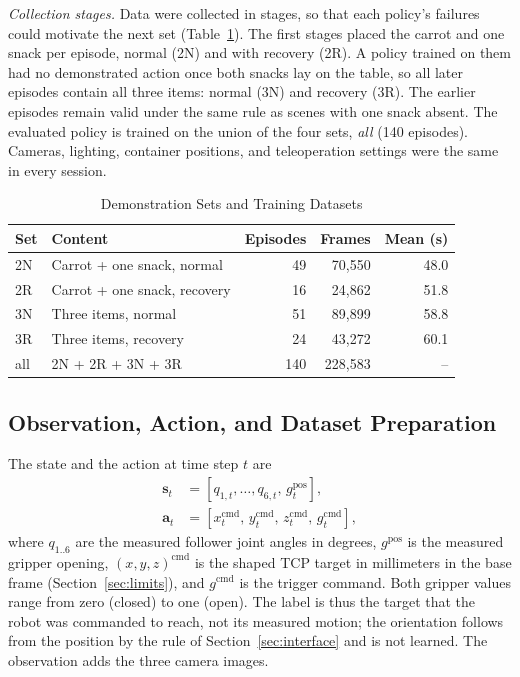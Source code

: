 \emph{Collection stages.}
Data were collected in stages, so that each policy's failures could motivate
the next set (Table~\ref{tab:datasets}). The first stages placed the carrot
and one snack per episode, normal (2N) and with recovery (2R). A policy trained
on them had no demonstrated action once both snacks lay on the table, so all
later episodes contain all three items: normal (3N) and recovery (3R). The
earlier episodes remain valid under the same rule as scenes with one snack
absent. The evaluated policy is trained on the union of the four sets,
\emph{all} (140 episodes). Cameras, lighting,
container positions, and teleoperation settings were the same in every session.

\begin{table}[t]
\caption{Demonstration Sets and Training Datasets}
\label{tab:datasets}
\centering
\footnotesize
\setlength{\tabcolsep}{4pt}
\begin{tabular}{@{}llrrr@{}}
\toprule
Set & Content & Episodes & Frames & Mean (s)\\
\midrule
2N & Carrot + one snack, normal & 49 & 70{,}550 & 48.0\\
2R & Carrot + one snack, recovery & 16 & 24{,}862 & 51.8\\
3N & Three items, normal & 51 & 89{,}899 & 58.8\\
3R & Three items, recovery & 24 & 43{,}272 & 60.1\\
\midrule
all & 2N + 2R + 3N + 3R & 140 & 228{,}583 & --\\
\bottomrule
\end{tabular}
\end{table}

\subsection{Observation, Action, and Dataset Preparation}
\label{sec:dataset}
The state and the action at time step $t$ are
\begin{align}
 \mathbf{s}_t &= [q_{1,t},\ldots,q_{6,t},\,g^{\mathrm{pos}}_t],\\
 \mathbf{a}_t &= [x^{\mathrm{cmd}}_t,\,y^{\mathrm{cmd}}_t,\,z^{\mathrm{cmd}}_t,\,g^{\mathrm{cmd}}_t],
\end{align}
where $q_{1..6}$ are the measured follower joint angles in degrees, $g^{\mathrm{pos}}$
is the measured gripper opening, $(x,y,z)^{\mathrm{cmd}}$ is the shaped TCP
target in millimeters in the base frame (Section~\ref{sec:limits}), and
$g^{\mathrm{cmd}}$ is the trigger command. Both gripper values range from zero
(closed) to one (open). The label is thus the target that the robot was
commanded to reach, not its measured motion; the orientation follows from
the position by the rule of Section~\ref{sec:interface} and is not learned.
The observation adds the three camera images.


